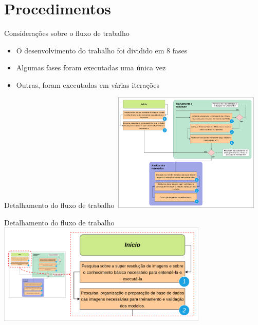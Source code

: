 \documentclass{beamer}
\begin{document}
    \section{Procedimentos}

    \begin{frame}{Considerações sobre o fluxo de trabalho}{\thesection \, \secname}
        \begin{itemize}
            \item O desenvolvimento do trabalho foi dividido em 8 fases
            \item Algumas fases foram executadas uma única vez
            \item Outras, foram executadas em várias iterações
        \end{itemize}
    \end{frame}

    \begin{frame}{Detalhamento do fluxo de trabalho}{\thesection \, \secname}
        \centering
        \includegraphics[width=7cm]{img/flow_diagram_development.png} 
        \label{fig:diagrama_1}
    \end{frame}
    
    \begin{frame}{Detalhamento do fluxo de trabalho}{\thesection \, \secname}
        \centering
        \includegraphics[width=10cm]{img/flow_diagram_development_p1.png} \\
        \label{fig:diagrama_1}
    \end{frame}
    
\end{document}
